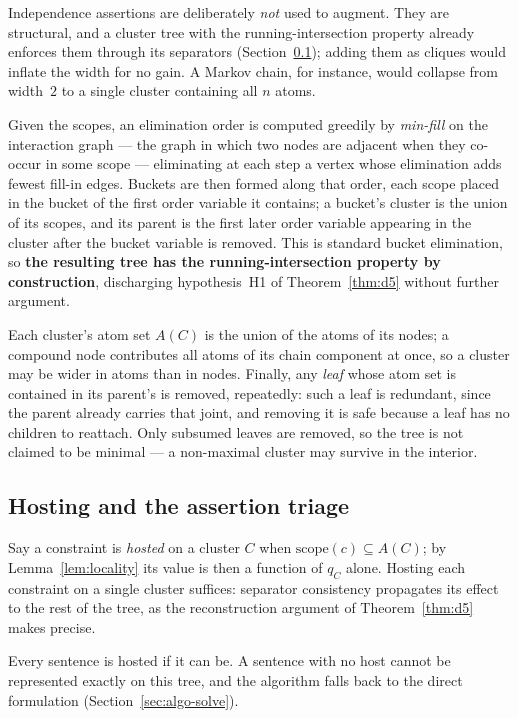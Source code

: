 \documentclass[11pt]{article}
\theoremstyle{definition}
\newcommand{\scope}{\mathrm{scope}}
\begin{document}
Independence assertions are deliberately \emph{not} used to augment. They are
structural, and a cluster tree with the running-intersection property already
enforces them through its separators (Section~\ref{sec:algo-host}); adding them
as cliques would inflate the width for no gain. A Markov chain, for instance,
would collapse from width~$2$ to a single cluster containing all $n$ atoms.

Given the scopes, an elimination order is computed greedily by \emph{min-fill} on
the interaction graph --- the graph in which two nodes are adjacent when they
co-occur in some scope --- eliminating at each step a vertex whose elimination
adds fewest fill-in edges. Buckets are then formed along that order, each scope
placed in the bucket of the first order variable it contains; a bucket's cluster
is the union of its scopes, and its parent is the first later order variable
appearing in the cluster after the bucket variable is removed. This is standard
bucket elimination, so \textbf{the resulting tree has the running-intersection
property by construction}, discharging hypothesis~H1 of
Theorem~\ref{thm:d5} without further argument.

Each cluster's atom set $A(C)$ is the union of the atoms of its nodes; a compound
node contributes all atoms of its chain component at once, so a cluster may be
wider in atoms than in nodes. Finally, any \emph{leaf} whose atom set is contained
in its parent's is removed, repeatedly: such a leaf is redundant, since the parent
already carries that joint, and removing it is safe because a leaf has no children
to reattach. Only subsumed leaves are removed, so the tree is not claimed to be
minimal --- a non-maximal cluster may survive in the interior.

\subsection{Hosting and the assertion triage}\label{sec:algo-host}

Say a constraint is \emph{hosted} on a cluster $C$ when $\scope(c)\subseteq A(C)$;
by Lemma~\ref{lem:locality} its value is then a function of $q_C$ alone. Hosting
each constraint on a single cluster suffices: separator consistency propagates its
effect to the rest of the tree, as the reconstruction argument of
Theorem~\ref{thm:d5} makes precise.

Every sentence is hosted if it can be. A sentence with no host cannot be
represented exactly on this tree, and the algorithm falls back to the direct
formulation (Section~\ref{sec:algo-solve}).
\end{document}
